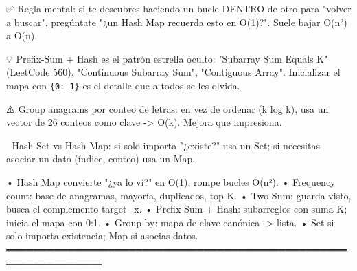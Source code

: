 \begin{dsaentrevistas}

✅ Regla mental: si te descubres haciendo un bucle DENTRO de otro para
   "volver a buscar", pregúntate "¿un Hash Map recuerda esto en O(1)?".
   Suele bajar O(n²) a O(n).

💡 Prefix-Sum + Hash es el patrón estrella oculto: "Subarray Sum Equals
   K" (LeetCode 560), "Continuous Subarray Sum", "Contiguous Array".
   Inicializar el mapa con \verb|{0: 1}| es el detalle que a todos se les
   olvida.

⚠️ Group anagrams por conteo de letras: en vez de ordenar (k log k),
   usa un vector de 26 conteos como clave -> O(k). Mejora que impresiona.

🔑 Hash Set vs Hash Map: si solo importa "¿existe?" usa un Set; si
   necesitas asociar un dato (índice, conteo) usa un Map.

\end{dsaentrevistas}

\begin{dsaresumen}

• Hash Map convierte "¿ya lo vi?" en O(1): rompe bucles O(n²).
• Frequency count: base de anagramas, mayoría, duplicados, top-K.
• Two Sum: guarda visto, busca el complemento target−x.
• Prefix-Sum + Hash: subarreglos con suma K; inicia el mapa con {0:1}.
• Group by: mapa de clave canónica -> lista.
• Set si solo importa existencia; Map si asocias datos.
════════════════════════════════════════════════════════════════

\end{dsaresumen}
